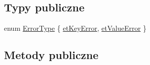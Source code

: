 \subsection*{Typy publiczne}
\begin{DoxyCompactItemize}
\item 
enum \hyperlink{class_q_c_p_error_bars_a95f0220f11a72648b96480a85ce26474}{Error\+Type} \{ \hyperlink{class_q_c_p_error_bars_a95f0220f11a72648b96480a85ce26474a9fca24d20d5376e41be216fc9b08cd21}{et\+Key\+Error}, 
\hyperlink{class_q_c_p_error_bars_a95f0220f11a72648b96480a85ce26474a5f760fc9c0a98c7f1e93e33bf54e9d83}{et\+Value\+Error}
 \}
\end{DoxyCompactItemize}
\subsection*{Metody publiczne}
